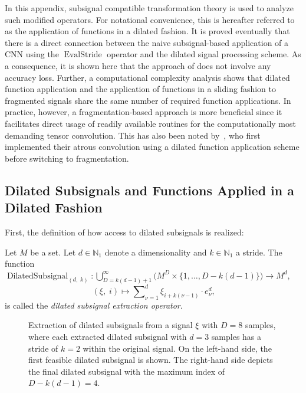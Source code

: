 \documentclass[journal]{IEEEtran}
\newcommand{\N}{\mathbb{N}}
\newcommand{\discint}[2]{\{#1,\dotsc,#2\}}
\DeclareMathOperator{\EvalStride}{EvalStride}
\DeclareMathOperator{\DilatedSubsignal}{DilatedSubsignal}
\begin{document}
In this appendix, subsignal compatible transformation theory is used to analyze such modified operators.
For notational convenience, this is hereafter referred to as the application of functions in a dilated fashion.
It is proved eventually that there is a direct connection between the naive subsignal-based application of a CNN using the $\EvalStride$ operator and the dilated signal processing scheme.
As a consequence, it is shown here that the approach of  does not involve any accuracy loss.
Further, a computational complexity analysis shows that dilated function application and the application of functions in a sliding fashion to fragmented signals share the same number of required function applications.
In practice, however, a fragmentation-based approach is more beneficial since it facilitates direct usage of readily available routines for the computationally most demanding tensor convolution.
This has also been noted by~, who first implemented their atrous convolution using a dilated function application scheme before switching to fragmentation.

\subsection{Dilated Subsignals and Functions Applied in a Dilated Fashion}
First, the definition of how access to dilated subsignals is realized:
\begin{definition}
\label{def:dilatedsubsignal}
Let $M$ be a set.
Let $d\in\N_1$ denote a dimensionality and $k\in\N_1$ a stride.
The function $\DilatedSubsignal_{(d,\; k)}\colon\bigcup_{D = k(d - 1) + 1}^\infty\big(M^D\times\discint{1}{D - k(d - 1)}\big)\to M^d$,
\begin{displaymath}
  (\xi,\; i)\mapsto\sum\nolimits_{\nu = 1}^d \xi_{i + k(\nu - 1)}\cdot e_\nu^d\text{,}
\end{displaymath}
is called the \emph{dilated subsignal extraction operator}.
\end{definition}\begin{figure}[t]
  \centering
  \caption{Extraction of dilated subsignals from a signal $\xi$ with $D = 8$ samples, where each extracted dilated subsignal with $d = 3$ samples has a stride of $k = 2$ within the original signal. On the left-hand side, the first feasible dilated subsignal is shown. The right-hand side depicts the final dilated subsignal with the maximum index of $D - k(d - 1) = 4$.}
  \label{fig:dilatedsubsignal}
\end{figure}
\end{document}

